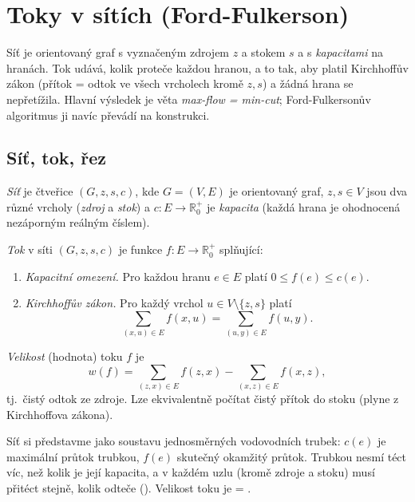 \documentclass[11pt,a4paper]{article}
\begin{document}
\section{Toky v sítích (Ford-Fulkerson)}

Síť je orientovaný graf s vyznačeným zdrojem $z$ a stokem $s$ a s \emph{kapacitami} na hranách. Tok udává, kolik proteče každou hranou, a to tak, aby platil Kirchhoffův zákon (přítok = odtok ve všech vrcholech kromě $z,s$) a žádná hrana se nepřetížila. Hlavní výsledek je věta \emph{max-flow = min-cut}; Ford-Fulkersonův algoritmus ji navíc převádí na konstrukci.

\subsection{Síť, tok, řez}

\begin{definice}[Síť]
\emph{Síť} je čtveřice $(G,z,s,c)$, kde $G=(V,E)$ je orientovaný graf, $z,s\in V$ jsou dva různé vrcholy (\emph{zdroj} a \emph{stok}) a $c\colon E\to\mathbb{R}_0^{+}$ je \emph{kapacita} (každá hrana je ohodnocená nezáporným reálným číslem).
\end{definice}

\begin{definice}[Tok]
\emph{Tok} v síti $(G,z,s,c)$ je funkce $f\colon E\to\mathbb{R}_0^{+}$ splňující:
\begin{enumerate}[label=(\arabic*)]
  \item \emph{Kapacitní omezení.} Pro každou hranu $e\in E$ platí $0\le f(e)\le c(e)$.
  \item \emph{Kirchhoffův zákon.} Pro každý vrchol $u\in V\setminus\{z,s\}$ platí
  \[ \sum_{(x,u)\in E}f(x,u)=\sum_{(u,y)\in E}f(u,y). \]
\end{enumerate}
\emph{Velikost} (hodnota) toku $f$ je
\[ w(f)=\sum_{(z,x)\in E}f(z,x)-\sum_{(x,z)\in E}f(x,z), \]
tj.\ čistý odtok ze zdroje. Lze ekvivalentně počítat čistý přítok do stoku (plyne z Kirchhoffova zákona).
\end{definice}

\begin{intuice}
Síť si představme jako soustavu jednosměrných vodovodních trubek: $c(e)$ je maximální průtok trubkou, $f(e)$ skutečný okamžitý průtok. Trubkou nesmí téct víc, než kolik je její kapacita, a v každém uzlu (kromě zdroje a stoku) musí přitéct stejně, kolik odteče (). Velikost toku je  = .
\end{intuice}
\end{document}
